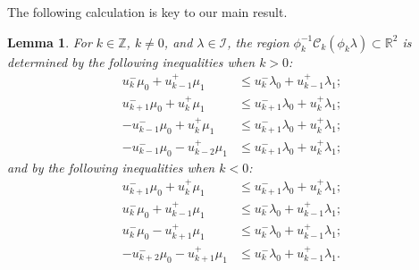 \documentclass{amsart}
\newtheorem{lemma}[theorem]{Lemma}
\numberwithin{theorem}{section}
\newcommand{\cC}{\mathcal{C}}
\newcommand{\cI}{\mathcal{I}}
\newcommand{\RR}{\mathbb{R}}
\newcommand{\ZZ}{\mathbb{Z}}
\begin{document}
  The following calculation is key to our main result.
  \begin{lemma}
    \label{le:dominance inequalities}
    For $k\in\ZZ$, $k\ne0$, and $\lambda\in\cI$, the region $\phi_k^{-1}\cC_k(\phi_k\lambda)\subset\RR^2$ is determined by the following inequalities when $k>0$:
    \begin{align}
      \label{ineq:1} u_k^-\mu_0+u_{k-1}^+\mu_1 &\le u_k^-\lambda_0+u_{k-1}^+\lambda_1;\\
      \label{ineq:2} u_{k+1}^-\mu_0+u_k^+\mu_1 &\le u_{k+1}^-\lambda_0+u_k^+\lambda_1;\\
      \label{ineq:3} -u_{k-1}^-\mu_0+u_k^+\mu_1 &\le u_{k+1}^-\lambda_0+u_k^+\lambda_1;\\
      \label{ineq:4} -u_{k-1}^-\mu_0-u_{k-2}^+\mu_1 &\le u_{k+1}^-\lambda_0+u_k^+\lambda_1;
    \end{align}
    and by the following inequalities when $k<0$:
    \begin{align*}
      u_{k+1}^-\mu_0+u_k^+\mu_1 &\le u_{k+1}^-\lambda_0+u_k^+\lambda_1;\\
      u_k^-\mu_0+u_{k-1}^+\mu_1 &\le u_k^-\lambda_0+u_{k-1}^+\lambda_1;\\
      u_k^-\mu_0-u_{k+1}^+\mu_1 &\le u_k^-\lambda_0+u_{k-1}^+\lambda_1;\\
      -u_{k+2}^-\mu_0-u_{k+1}^+\mu_1 &\le u_k^-\lambda_0+u_{k-1}^+\lambda_1.
    \end{align*}
    

\end{lemma}
\end{document}
